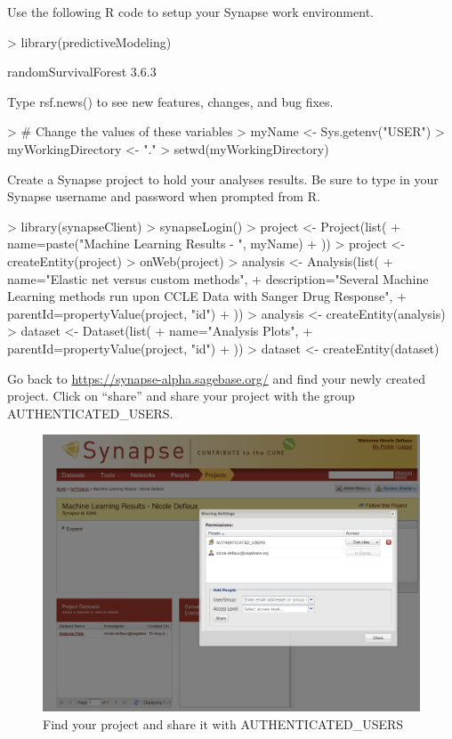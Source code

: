 \documentclass[10pt]{article}
\begin{document}
Use the following R code to setup your Synapse work environment.

\begin{Schunk}
\begin{Sinput}
> library(predictiveModeling)
\end{Sinput}
\begin{Soutput}
randomSurvivalForest 3.6.3

Type rsf.news() to see new features, changes, and bug fixes.
\end{Soutput}
\begin{Sinput}
> # Change the values of these variables 
> myName <- Sys.getenv("USER")
> myWorkingDirectory <- "."
> setwd(myWorkingDirectory)
\end{Sinput}
\end{Schunk}

Create a Synapse project to hold your analyses results.  Be sure to type in
your Synapse username and password when prompted from R.

\begin{Schunk}
\begin{Sinput}
> library(synapseClient)
> synapseLogin()
> project <- Project(list(
+   name=paste("Machine Learning Results - ", myName)
+   ))
> project <- createEntity(project)
> onWeb(project)
> analysis <- Analysis(list(
+     name="Elastic net versus custom methods",
+     description="Several Machine Learning methods run upon CCLE Data with Sanger Drug Response",
+     parentId=propertyValue(project, "id")
+     ))
> analysis <- createEntity(analysis)
> dataset <- Dataset(list(
+   name="Analysis Plots",
+   parentId=propertyValue(project, "id")
+   ))
> dataset <- createEntity(dataset)
\end{Sinput}
\end{Schunk}

Go back to \url{https://synapse-alpha.sagebase.org/} and find your newly created
project.  Click on ``share'' and share your project with the group
AUTHENTICATED\_USERS.

\begin{figure}[H]
  \centering
  \includegraphics{synapseScreenshots/Sharing.png}
  \caption{Find your project and share it with AUTHENTICATED\_USERS}
\end{figure}
\end{document}
